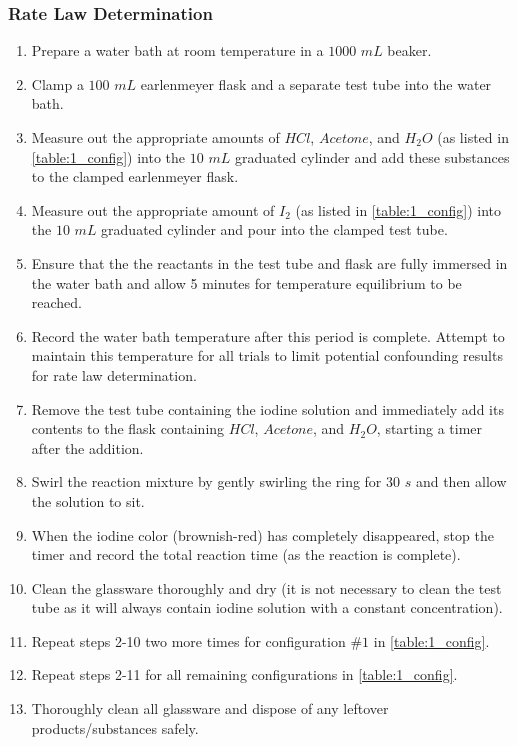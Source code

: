 \subsubsection{Rate Law Determination}
	\begin{enumerate}[itemsep=-1ex]
	  \item Prepare a water bath at room temperature in a $1000$ $mL$ beaker.
	  \item Clamp a $100$ $mL$ earlenmeyer flask and a separate test tube into the water bath.
	  \item Measure out the appropriate amounts of $HCl$, $Acetone$, and $H_2O$ (as listed in \cref{table:1_config}) into the $10$ $mL$ graduated cylinder and add these substances to the clamped earlenmeyer flask.
	  \item Measure out the appropriate amount of $I_2$ (as listed in \cref{table:1_config}) into the $10$ $mL$ graduated cylinder and pour into the clamped test tube.
	  \item Ensure that the the reactants in the test tube and flask are fully immersed in the water bath and allow 5 minutes for temperature equilibrium to be reached.
	  \item Record the water bath temperature after this period is complete. Attempt to maintain this temperature for all trials to limit potential confounding results for rate law determination.
	  \item Remove the test tube containing the iodine solution and immediately add its contents to the flask containing $HCl$, $Acetone$, and $H_2O$, starting a timer after the addition.
	  \item Swirl the reaction mixture by gently swirling the ring for $30$ $s$ and then allow the solution to sit.
	  \item When the iodine color (brownish-red) has completely disappeared, stop the timer and record the total reaction time (as the reaction is complete).
	  \item Clean the glassware thoroughly and dry (it is not necessary to clean the test tube as it will always contain iodine solution with a constant concentration).
	  \item Repeat steps 2-10 two more times for configuration $\#1$ in \cref{table:1_config}.
	  \item Repeat steps 2-11 for all remaining configurations in \cref{table:1_config}.
	  \item Thoroughly clean all glassware and dispose of any leftover products/substances safely.
	\end{enumerate}

